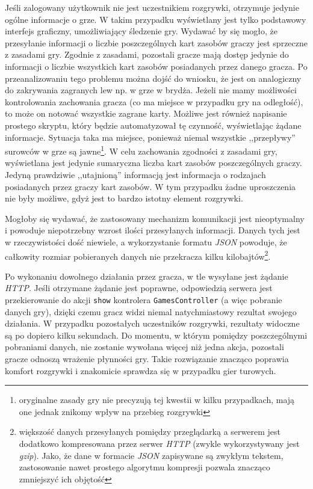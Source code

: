\documentclass[a4paper,12pt]{article}
\begin{document}
Jeśli zalogowany użytkownik nie jest uczestnikiem rozgrywki, otrzymuje
jedynie ogólne informacje o grze. W takim przypadku wyświetlany jest
tylko podstawowy interfejs graficzny, umożliwiający śledzenie
gry. Wydawać by się mogło, że przesyłanie informacji o liczbie
poszczególnych kart zasobów graczy jest sprzeczne z zasadami gry.
Zgodnie z zasadami, pozostali gracze mają dostęp jedynie do informacji
o liczbie wszystkich kart zasobów posiadanych przez danego gracza. Po
przeanalizowaniu tego problemu można dojść do wniosku, że jest on
analogiczny do zakrywania zagranych lew np. w grze w brydża. Jeżeli
nie mamy możliwości kontrolowania zachowania gracza (co ma miejsce w
przypadku gry na odległość), to może on notować wszystkie zagrane
karty. Możliwe jest również napisanie prostego skryptu, który będzie
automatyzował tę czynność, wyświetlając żądane informacje. Sytuacja
taka ma miejsce, ponieważ niemal wszystkie ,,przepływy'' surowców w
grze są jawne\footnote{oryginalne zasady gry nie precyzują tej kwestii
  w kilku przypadkach, mają one jednak znikomy wpływ na przebieg
  rozgrywki}. W celu zachowania zgodności z zasadami gry, wyświetlana
jest jedynie sumaryczna liczba kart zasobów poszczególnych
graczy. Jedyną prawdziwie ,,utajnioną'' informacją jest informacja o
rodzajach posiadanych przez graczy kart zasobów. W tym przypadku żadne
uproszczenia nie były możliwe, gdyż jest to bardzo istotny element
rozgrywki.

Mogłoby się wydawać, że zastosowany mechanizm komunikacji jest
nieoptymalny i powoduje niepotrzebny wzrost ilości przesyłanych
informacji. Danych tych jest w rzeczywistości dość niewiele, a
wykorzystanie formatu \emph{JSON} powoduje, że całkowity rozmiar
pobieranych danych nie przekracza kilku kilobajtów\footnote{większość
  danych przesyłanych pomiędzy przeglądarką a serwerem jest dodatkowo
  kompresowana przez serwer \emph{HTTP} (zwykle wykorzystywany jest
  \emph{gzip}). Jako, że dane w formacie \emph{JSON} zapisywane są
  zwykłym tekstem, zastosowanie nawet prostego algorytmu kompresji
  pozwala znacząco zmniejszyć ich objętość}.

Po wykonaniu dowolnego działania przez gracza, w tle wysyłane jest
żądanie \emph{HTTP}. Jeśli otrzymane żądanie jest poprawne,
odpowiedzią serwera jest przekierowanie do akcji \texttt{show}
kontrolera \texttt{GamesController} (a więc pobranie danych gry),
dzięki czemu gracz widzi niemal natychmiastowy rezultat swojego
działania. W przypadku pozostałych uczestników rozgrywki, rezultaty
widoczne są po dopiero kilku sekundach. Do momentu, w którym pomiędzy
poszczególnymi pobraniami danych, nie zostanie wywołana więcej niż
jedna akcja, pozostali gracze odnoszą wrażenie płynności gry. Takie
rozwiązanie znacząco poprawia komfort rozgrywki i znakomicie sprawdza
się w przypadku gier turowych.
\end{document}
